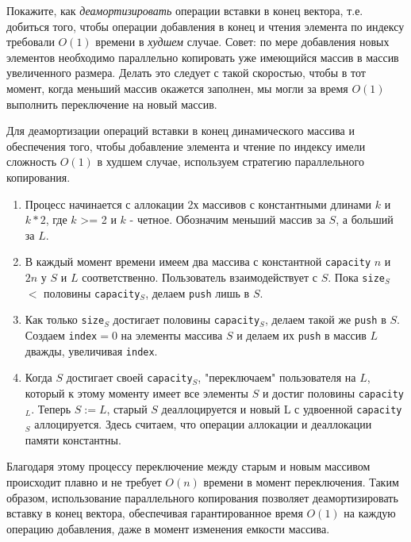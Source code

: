 \documentclass[11pt]{article}
\begin{document}
\begin{problem}{30}
	Покажите, как \emph{деамортизировать} операции вставки в конец вектора, т.е. добиться того, чтобы операции добавления в конец и чтения элемента по индексу требовали $O(1)$ времени в \emph{худшем} случае. Совет: по мере добавления новых элементов необходимо параллельно копировать уже имеющийся массив в массив увеличенного размера. Делать это следует с такой скоростью, чтобы в тот момент, когда меньший массив окажется заполнен, мы могли за время $O(1)$ выполнить переключение на новый массив.
	\end{problem}
	
	\begin{solution}
		Для деамортизации операций вставки в конец динамического массива и обеспечения того, чтобы добавление элемента и чтение по индексу имели сложность $O(1)$ в худшем случае, используем стратегию параллельного копирования.
	
		\begin{enumerate}
			\item Процесс начинается с аллокации 2х массивов с константными длинами $ k $ и $ k * 2 $, где $ k $ >= 2 и $ k $ - четное. Обозначим меньший массив за $S$, а больший за $L$.
			
			\item В каждый момент времени имеем два массива с константной \texttt{capacity} $ n $ и $ 2n $ у $S$ и $L$ соответственно. Пользователь взаимодействует с $S$. Пока \texttt{size}$_S$ $<$ половины \texttt{capacity}$_S$, делаем \texttt{push} лишь в $S$.
	
			\item Как только \texttt{size}$_S$ достигает половины \texttt{capacity}$_S$, делаем такой же \texttt{push} в $S$. Создаем \texttt{index}$=0$ на элементы массива $S$ и делаем их \texttt{push} в массив $L$ дважды, увеличивая \texttt{index}.
		
			\item Когда $S$ достигает своей \texttt{capacity}$_S$, "переключаем" пользователя на $L$, который к этому моменту имеет все элементы $S$ и достиг половины \texttt{capacity}$_L$. Теперь $S:=L$, старый $S$ деаллоцируется и новый L с удвоенной \texttt{capacity}$_S$ аллоцируется. Здесь считаем, что операции аллокации и деаллокации памяти константны.
		\end{enumerate}
	
		Благодаря этому процессу переключение между старым и новым массивом происходит плавно и не требует $O(n)$ времени в момент переключения.
		Таким образом, использование параллельного копирования позволяет деамортизировать вставку в конец вектора, обеспечивая гарантированное время $O(1)$ на каждую операцию добавления, даже в момент изменения емкости массива.
	\end{solution}
	
\end{document}
